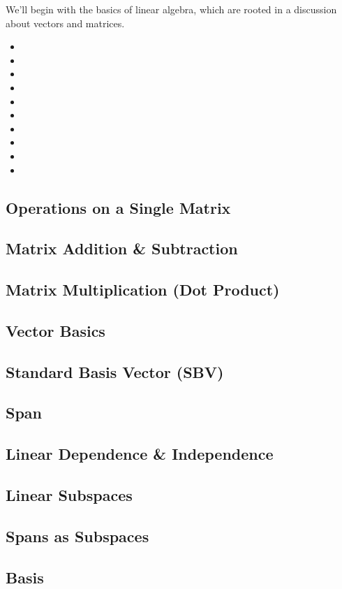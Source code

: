 
We'll begin with the basics of linear algebra, which are rooted in a discussion about vectors and matrices.

\begin{itemize}
	\item {}
	\item {}
	\item {}
	\item {}
	\item {}
	\item {}
	\item {}
	\item {}
	\item {}
	\item {}
\end{itemize}

\subsection{Operations on a Single Matrix}\label{concept1.1}

\subsection{Matrix Addition \& Subtraction}\label{concept1.2}

\subsection{Matrix Multiplication (Dot Product)}\label{concept1.3}

\subsection{Vector Basics}\label{concept1.4}

\subsection{Standard Basis Vector (SBV)}\label{concept1.5}

\subsection{Span}\label{concept1.6}

\subsection{Linear Dependence \& Independence}\label{concept1.7}

\subsection{Linear Subspaces}\label{concept1.8}

\subsection{Spans as Subspaces}\label{concept1.9}

\subsection{Basis}\label{concept1.10}

